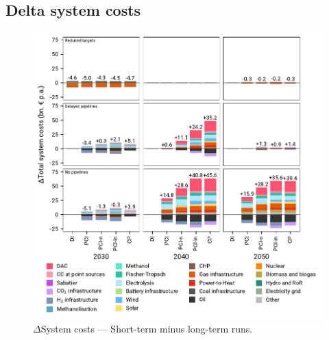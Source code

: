 \documentclass[preprint,12pt,sort&compress]{elsarticle}
\begin{document}
\clearpage
\subsection{Delta system costs}
\label{sec:delta_system_costs}
\begin{figure}[htbp]
  \centering
  \includegraphics[width=\textwidth]{costs_overview_extended.pdf}
  \caption{$\Delta$System costs --- Short-term minus long-term runs.}
  \label{fig:costs_overview_extended}
\end{figure}

\clearpage
\end{document}

